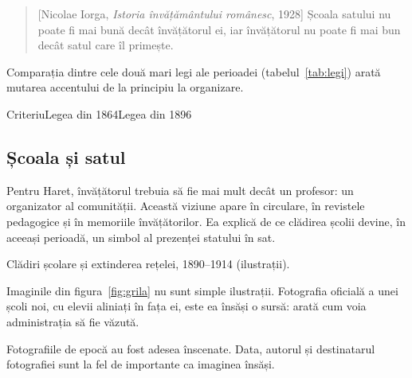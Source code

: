 \documentclass{texign-article}
\begin{document}
\begin{quotation}[Nicolae Iorga, \emph{Istoria învățământului românesc}, 1928]
Școala satului nu poate fi mai bună decât învățătorul ei, iar învățătorul nu poate fi mai bun decât satul care îl primește.
\end{quotation}

Comparația dintre cele două mari legi ale perioadei (tabelul~\ref{tab:legi}) arată mutarea accentului de la principiu la organizare.

\begin{comparison}{Criteriu}{Legea din 1864}{Legea din 1896}
\end{comparison}

\subsection{Școala și satul}

Pentru Haret, învățătorul trebuia să fie mai mult decât un profesor: un organizator al comunității. Această viziune apare în circulare, în revistele pedagogice și în memoriile învățătorilor.\cite[Cf.][47]{iorga1928} Ea explică de ce clădirea școlii devine, în aceeași perioadă, un simbol al prezenței statului în sat.

\begin{imagegrid}{Clădiri școlare și extinderea rețelei, 1890–1914 (ilustrații).\label{fig:grila}}
\end{imagegrid}

Imaginile din figura~\ref{fig:grila} nu sunt simple ilustrații. Fotografia oficială a unei școli noi, cu elevii aliniați în fața ei, este ea însăși o sursă: arată cum voia administrația să fie văzută.\cite[passim]{hitchins1994}

\begin{remark}
Fotografiile de epocă au fost adesea înscenate. Data, autorul și destinatarul fotografiei sunt la fel de importante ca imaginea însăși.
\end{remark}
\end{document}
